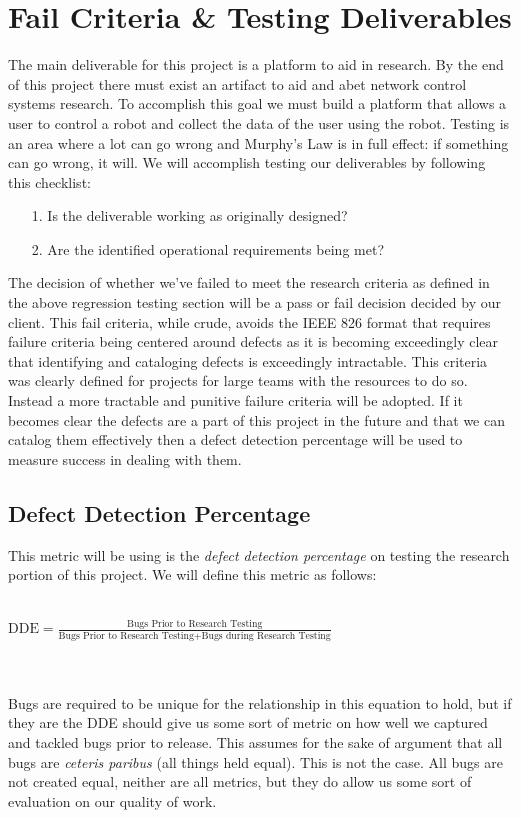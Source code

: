 \documentclass[english,12pt]{article}
\begin{document}
\section{Fail Criteria \& Testing Deliverables}
The main deliverable for this project is a platform to aid in research. By the end of this project there 
must exist an artifact to aid and abet network control systems research. To accomplish this goal we must 
build a platform that allows a user to control a robot and collect the data of the user using the robot. 
Testing is an area where a lot can go wrong and Murphy's Law is in full effect: if something can go wrong, 
it will. We will accomplish testing our deliverables by following this checklist:\\
\begin{itemize}
    \item[1.] Is the deliverable working as originally designed?
    \item[2.] Are the identified operational requirements being met?
\end{itemize}
The decision of whether we've failed to meet the research criteria as defined in the above regression testing section 
will be a pass or fail decision decided by our client. This fail criteria, while crude, avoids the IEEE 826 format 
that requires failure criteria being centered around defects as it is becoming exceedingly clear that identifying and cataloging 
defects is exceedingly intractable. This criteria was clearly defined for projects for large teams with the resources to do so. Instead 
a more tractable and punitive failure criteria will be adopted. If it becomes clear the defects are a part of this project in the future 
and that we can catalog them effectively then a defect detection percentage will be used to measure success in dealing with them.
\subsection{Defect Detection Percentage}
This metric will be using is the \textit{defect detection percentage} on testing the research portion of this project. 
We will define this metric as follows:\\\\
\centerline{$\text{DDE} = \frac{\text{Bugs Prior to Research Testing}}{\text{Bugs Prior to Research Testing} + \text{Bugs during Research Testing}}$}
\\\\
Bugs are required to be unique for the relationship in this equation to hold, but if they are the DDE should 
give us some sort of metric on how well we captured and tackled bugs prior to release. This 
assumes for the sake of argument that all bugs are \textit{ceteris paribus} (all things held equal).
This is not the case. All bugs are not created equal, neither are all metrics, but they do 
allow us some sort of evaluation on our quality of work.\\\\
\end{document}
